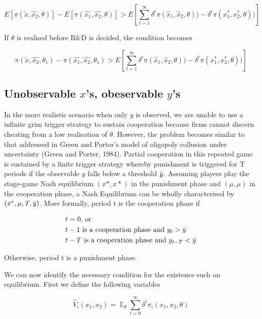 \documentclass{article}
\begin{document}
\begin{equation*}
    E[\pi(\tilde{x}, \hat{x_2},\theta)] - E[\pi(\hat{x_1}, \hat{x_2},\theta)] >  E\left[\sum_{t=1}^\infty \delta^t \pi(\hat{x}_1,\hat{x}_2,\theta)) - \delta^t \pi(x_1^*,x_2^*,\theta)) \right]
\end{equation*}

If $\theta$ is realised before R\&D is decided, the condition becomes

\begin{equation*}
    \pi(\tilde{x}, \hat{x_2},\theta_1) - \pi(\hat{x_1}, \hat{x_2},\theta_1) >  E\left[\sum_{t=1}^\infty \delta^t \pi(\hat{x}_1,\hat{x}_2,\theta)) - \delta^t \pi(x_1^*,x_2^*,\theta)) \right]
\end{equation*}

\subsection{Unobservable $x$'s, obeservable $y$'s}


In the more realistic scenario when only $y$ is observed, we are unable to use a infinite grim trigger strategy to sustain cooperation because firms cannot discern cheating from a low realisation of $\theta$. However, the problem becomes similar to that addressed in Green and Porter's model of oligopoly collusion under uncertainty (Green and Porter, 1984). Partial cooperation in this repeated game is sustained by a finite trigger strategy whereby punishment is triggered for T periods if the observable $y$ falls below a threshold $\Bar{y}$. Assuming players play the stage-game Nash equilibrium $(x*,x*)$ in the punishment phase and $(\mu,\mu)$ in the cooperation phase, a Nash Equilibrium can be wholly characterised by $(x^*,\mu, T, \Bar{y})$. More formally, period t is the cooperation phase if  

\begin{align*}
&t=0 \text{, or}\\
&t-1 \text{ is a cooperation phase and } y_t>\Bar{y}\\
&t-T \text{ is a cooperation phase and } y_{t-T}<\Bar{y}  
\end{align*}

Otherwise, period t is a punishment phase. 

We can now identify the necessary condition for the existence such an equilibrium. First we define the following variables  

\begin{equation*}
\hat{V}_i(x_1,x_2) = \mathop{\mathbb{E}}_\theta \sum_{t=0}^\infty \delta^t \pi_i(x_1,x_2,\theta)
\end{equation*}
\end{document}
